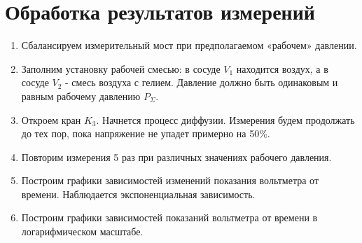 \documentclass[12pt,a4paper]{article}
\begin{document}
	\section{Обработка результатов измерений}
\begin{enumerate}

\item Сбалансируем измерительный мост при предполагаемом «рабочем»
давлении.  
\item Заполним установку рабочей смесью: в сосуде $V_1$ находится воздух, а в сосуде $V_2$ - смесь воздуха с гелием.  Давление должно быть одинаковым и равным рабочему давлению $P_\Sigma$. 
\item Откроем кран $K_3$. Начнется процесс диффузии. Измерения будем продолжать до тех пор,  пока напряжение не упадет примерно на 50$\%$.
\item  Повторим измерения 5 раз при различных значениях рабочего давления.
\item Построим графики зависимостей изменений показания вольтметра от времени. Наблюдается экспоненциальная зависимость.

\begin{figure}[h!]
\end{figure}

\item Построим графики зависимостей показаний вольтметра от времени в логарифмическом масштабе. 

\begin{figure}[h!]
\end{figure}


\end{enumerate}
\end{document}
